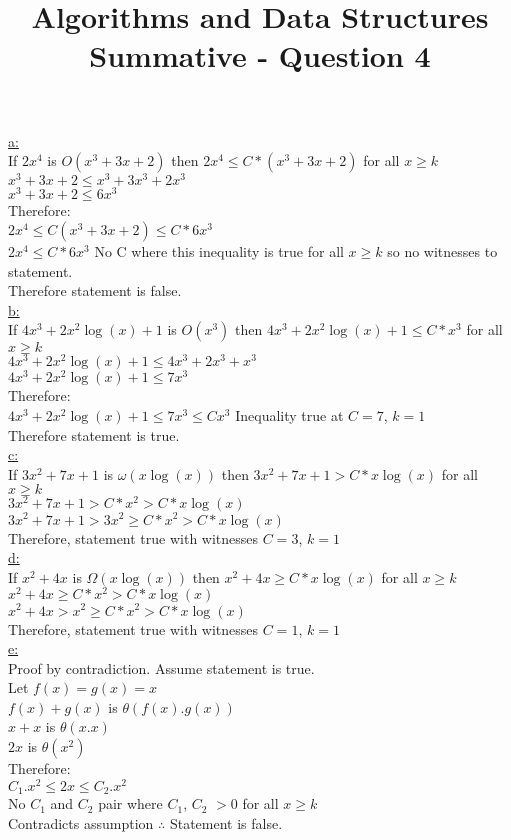 \documentclass[10pt,a4paper]{article}
\title{Algorithms and Data Structures Summative - Question 4}
\begin{document}
	\underline{a:}\\ 	
	If $2x^4$ is $O(x^3 + 3x + 2)$ then $2x^4 \leq C*(x^3 + 3x + 2)$ for all $x \geq k$\\	
	$x^3 + 3x + 2 \leq x^3 + 3x^3 + 2x^3$\\	
	$x^3 + 3x + 2 \leq 6x^3$\\	
	Therefore:\\	
	$2x^4 \leq C(x^3 + 3x + 2) \leq C * 6x^3$\\
	$2x^4 \leq C *6x^3$ No C where this inequality is true for all $x\geq k$ so no witnesses to statement.\\ 	
	Therefore statement is false.\\
	
	\underline{b:} \\
	If $4x^3 + 2x^2\log(x) + 1$ is $O(x^3)$ then $4x^3 + 2x^2\log(x) + 1 \leq C*x^3$ for all $x \geq k$ \\
	$4x^3 + 2x^2\log(x) + 1 \leq 4x^3 + 2x^3 + x^3$\\
	$4x^3 + 2x^2\log(x) + 1 \leq 7x^3$\\
	Therefore:\\
	$4x^3 + 2x^2\log(x) + 1 \leq 7x^3 \leq Cx^3$ Inequality true at $C=7$, $k=1$\\
	Therefore statement is true.\\
	
	\underline{c:}\\
	If $3x^2 + 7x + 1$ is $\omega (x\log(x))$ then $3x^2 + 7x + 1 > C*x\log(x)$ for all $x \geq k$\\
	$3x^2 + 7x + 1 > C*x^2 > C*x\log(x)$\\
	$3x^2 + 7x + 1 > 3x^2 \geq C*x^2 > C*x\log(x)$\\
	Therefore, statement true with witnesses $C=3$, $k=1$\\
	
	\underline{d:}\\
	If $x^2 + 4x$ is $\Omega(x\log(x))$ then $x^2 + 4x \geq C*x\log(x)$ for all $x \geq k$ \\
	$x^2 + 4x \geq C*x^2 > C*x\log(x)$\\
	$x^2 + 4x > x^2 \geq C*x^2 > C*x\log(x)$\\
	Therefore, statement true with witnesses $C=1$, $k=1$\\
	
	\underline{e:}\\
	Proof by contradiction. Assume statement is true.\\
	Let $f(x) = g(x) = x$\\
	$f(x) + g(x)$ is $\theta(f(x).g(x))$\\
	$x + x$ is $\theta(x.x)$\\
	$2x$ is $\theta(x^2)$\\
	Therefore:\\
	$C_1.x^2 \leq 2x \leq C_2.x^2$\\
	No $C_1$ and $C_2$ pair where $C_1$, $C_2$ $>0$ for all $x \geq k$ \\
	Contradicts assumption $\therefore$ Statement is false.
	
\end{document}
